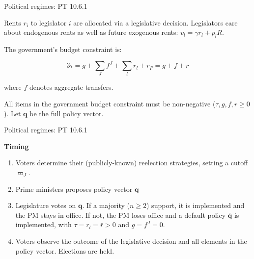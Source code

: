 \documentclass[11pt,aspectratio=169]{beamer}
\begin{document}
\begin{frame}{Political regimes: PT 10.6.1}

Rents $r_i$ to legislator $i$ are allocated via a legislative decision. Legislators care about endogenous rents as well as future exogenous rents: $v_{l}=\gamma r_{l}+p_{l} R$. \\
\vspace{1em} 

\pause

The government's budget constraint is:

$$ 3 \tau=g+\sum_{J} f^{J}+\sum_{l} r_{l}+r_{P}=g+f+r $$

where $f$ denotes aggregate transfers. 
\vspace{1em}

\pause


All items in the government budget constraint must be non-negative ($\tau, g, f, r \geq 0$). Let $\mathbf{q}$ be the full policy vector.


\end{frame}


\begin{frame}{Political regimes: PT 10.6.1}

\textbf{Timing}

\begin{enumerate}
\item Voters determine their (publicly-known) reelection strategies, setting a cutoff $\varpi_J$.
\item Prime ministers proposes policy vector $\mathbf{q}$
\item Legislature votes on $\mathbf{q}$. If a majority ($n \geq 2$) support, it is implemented and the PM stays in office. If not, the PM loses office and a default policy $\mathbf{\bar{q}}$ is implemented, with $\tau = r_l = \bar{r} > 0$ and $g = f^J = 0$.
\item Voters observe the outcome of the legislative decision and all elements in the policy vector. Elections are held. 
\end{enumerate}


\end{frame}
\end{document}
